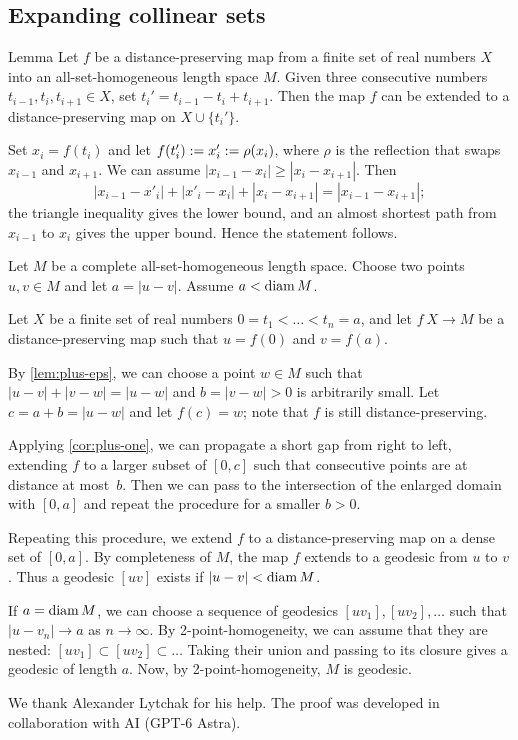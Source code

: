 \documentclass[leqno,a4paper,10pt]{article}
\begin{document}
\subsection*{Expanding collinear sets}

\begin{thm}{Lemma}\label{cor:plus-one}
Let $f$ be a distance-preserving map from a finite set of real numbers $X$ into an all-set-homogeneous length space $M$.
Given three consecutive numbers $t_{i-1},t_i,t_{i+1}\in X$, set $t_i'=t_{i-1}-t_i +t_{i+1}$.
Then the map $f$ can be extended to a distance-preserving map on $X\cup\{t_i'\}$.
\end{thm}

Set $x_i=f(t_i)$ and let $f(t_i')\mathrel{{:}{=}} x_i'\mathrel{{:}{=}}\rho(x_i)$, where $\rho$ is the reflection that swaps $x_{i-1}$ and $x_{i+1}$.
We can assume $|x_{i-1}-x_i|\ge |x_i-x_{i+1}|$.
Then
\[|x_{i-1}-x'_i|+|x'_i-x_i|+|x_i-x_{i+1}|=|x_{i-1}-x_{i+1}|;\]
the triangle inequality gives the lower bound, and an almost shortest path from
$x_{i-1}$ to $x_i$ gives the upper bound.
Hence the statement follows.
\qeds

Let $M$ be a complete all-set-homogeneous length space.
Choose two points $u,v\in M$ and let $a=|u-v|$.
Assume $a<\operatorname{\rm diam} M$.

Let $X$ be a finite set of real numbers $0=t_1<\ldots<t_n=a$,
and let $f\:X\to M$ be a distance-preserving map such that $u=f(0)$ and $v=f(a)$.

By \ref{lem:plus-eps}, we can choose a point $w\in M$ such that $|u-v|+|v-w|=|u-w|$
and $b=|v-w|>0$ is arbitrarily small.
Let $c=a+b=|u-w|$ and let $f(c)=w$;
note that $f$ is still distance-preserving.

Applying \ref{cor:plus-one}, we can propagate a short gap from right to left,
extending $f$ to a larger subset of $[0,c]$ such that consecutive points are at distance at most~$b$.
Then we can pass to the intersection of the enlarged domain with $[0,a]$ and repeat the procedure for a smaller $b>0$.

Repeating this procedure, we extend $f$ to a distance-preserving map on a dense set of $[0,a]$.
By completeness of $M$, the map $f$ extends to a geodesic from $u$ to $v$.
Thus a geodesic $[uv]$ exists if $|u-v|<\operatorname{\rm diam} M$.

If $a=\operatorname{\rm diam} M$, we can choose a sequence of geodesics $[uv_1],[uv_2],\ldots$ such that
$|u-v_n|\to a$ as $n\to\infty$.
By 2-point-homogeneity, we can assume that they are nested: $[uv_1]\subset[uv_2]\subset\ldots$
Taking their union and passing to its closure gives a geodesic of length $a$.
Now, by 2-point-homogeneity, $M$ is geodesic.
\qeds


We thank Alexander Lytchak for his help.
The proof was developed in collaboration with AI (GPT-6 Astra).

{\sloppy
\printbibliography[heading=bibintoc]
\fussy
}
\end{document}
